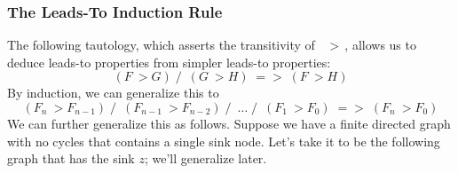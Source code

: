 \documentclass[fleqn,leqno]{article}
\begin{document}
\subsubsection{The Leads-To Induction Rule} 
%

The following tautology, which asserts the transitivity of~\,$~>$\,,
allows us to deduce leads-to properties from simpler leads-to
properties:
%
 \[ (F ~>G)\; /\ \; (G~>H)\; => \; (F ~> H) \]
By induction, we can generalize this to 
  \[ (F_{n}~>F_{n-1}) \; /\ \; (F_{n-1}~>F_{n-2}) \; /\ \; \ldots \; /\ \; (F_{1} ~> F_{0})
      \; => \; (F_{n} ~> F_{0})
 \]
We can further generalize this as follows.  Suppose we have a finite
directed graph with no cycles that contains a single sink node.  Let's
take it to be the following graph that has the sink $z$; we'll
generalize later.
%
\end{document}
